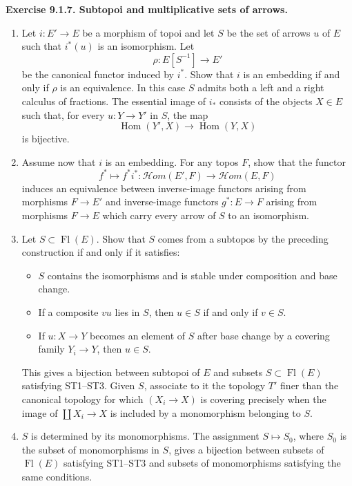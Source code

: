 \documentclass[11pt]{article}
\newcommand{\Hom}{\operatorname{Hom}}
\newcommand{\Fl}{\operatorname{Fl}}
\newcommand{\Hhom}{\mathcal{H}om}
\newenvironment{remarktext}[1]{\par\medskip\noindent\textbf{#1.}\ }{\par\medskip}
\begin{document}
\begin{remarktext}{Exercise 9.1.7. Subtopoi and multiplicative sets of arrows}
\begin{enumerate}[label=\alph*)]
\item Let \(i:E'\to E\) be a morphism of topoi and let \(S\) be the set of arrows \(u\) of \(E\) such that \(i^*(u)\) is an isomorphism. Let
\[
\rho:E[S^{-1}]\longrightarrow E'
\tag{9.1.7.1}
\]
be the canonical functor induced by \(i^*\). Show that \(i\) is an embedding if and only if \(\rho\) is an equivalence. In this case \(S\) admits both a left and a right calculus of fractions. The essential image of \(i_*\) consists of the objects \(X\in E\) such that, for every \(u:Y\to Y'\) in \(S\), the map
\[
\Hom(Y',X)\longrightarrow\Hom(Y,X)
\]
is bijective.

\item Assume now that \(i\) is an embedding. For any topos \(F\), show that the functor
\[
f^*\longmapsto f^*i^*:\Hhom(E',F)\longrightarrow\Hhom(E,F)
\]
induces an equivalence between inverse-image functors arising from morphisms \(F\to E'\) and inverse-image functors \(g^*:E\to F\) arising from morphisms \(F\to E\) which carry every arrow of \(S\) to an isomorphism.

\item Let \(S\subset \Fl(E)\). Show that \(S\) comes from a subtopos by the preceding construction if and only if it satisfies:
\begin{itemize}
\item[ST1)] \(S\) contains the isomorphisms and is stable under composition and base change.
\item[ST2)] If a composite \(vu\) lies in \(S\), then \(u\in S\) if and only if \(v\in S\).
\item[ST3)] If \(u:X\to Y\) becomes an element of \(S\) after base change by a covering family \(Y_i\to Y\), then \(u\in S\).
\end{itemize}
This gives a bijection between subtopoi of \(E\) and subsets \(S\subset\Fl(E)\) satisfying ST1--ST3. Given \(S\), associate to it the topology \(T'\) finer than the canonical topology for which \((X_i\to X)\) is covering precisely when the image of \(\coprod X_i\to X\) is included by a monomorphism belonging to \(S\).

\item \(S\) is determined by its monomorphisms. The assignment \(S\mapsto S_0\), where \(S_0\) is the subset of monomorphisms in \(S\), gives a bijection between subsets of \(\Fl(E)\) satisfying ST1--ST3 and subsets of monomorphisms satisfying the same conditions.


\end{enumerate}
\end{remarktext}
\end{document}
